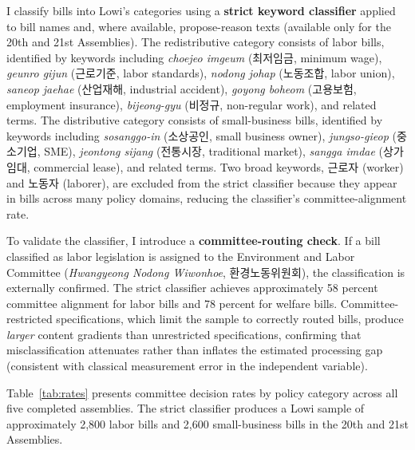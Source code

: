\documentclass[11pt]{article}
\begin{document}
I classify bills into Lowi's categories using a \textbf{strict keyword classifier} applied to bill names and, where available, propose-reason texts (available only for the 20th and 21st Assemblies). The redistributive category consists of labor bills, identified by keywords including \textit{choejeo imgeum} (최저임금, minimum wage), \textit{geunro gijun} (근로기준, labor standards), \textit{nodong johap} (노동조합, labor union), \textit{saneop jaehae} (산업재해, industrial accident), \textit{goyong boheom} (고용보험, employment insurance), \textit{bijeong-gyu} (비정규, non-regular work), and related terms. The distributive category consists of small-business bills, identified by keywords including \textit{sosanggo-in} (소상공인, small business owner), \textit{jungso-gieop} (중소기업, SME), \textit{jeontong sijang} (전통시장, traditional market), \textit{sangga imdae} (상가임대, commercial lease), and related terms. Two broad keywords, 근로자 (worker) and 노동자 (laborer), are excluded from the strict classifier because they appear in bills across many policy domains, reducing the classifier's committee-alignment rate.

To validate the classifier, I introduce a \textbf{committee-routing check}. If a bill classified as labor legislation is assigned to the Environment and Labor Committee (\textit{Hwangyeong Nodong Wiwonhoe}, 환경노동위원회), the classification is externally confirmed. The strict classifier achieves approximately 58 percent committee alignment for labor bills and 78 percent for welfare bills. Committee-restricted specifications, which limit the sample to correctly routed bills, produce \emph{larger} content gradients than unrestricted specifications, confirming that misclassification attenuates rather than inflates the estimated processing gap (consistent with classical measurement error in the independent variable).

Table~\ref{tab:rates} presents committee decision rates by policy category across all five completed assemblies. The strict classifier produces a Lowi sample of approximately 2,800 labor bills and 2,600 small-business bills in the 20th and 21st Assemblies.
\end{document}
